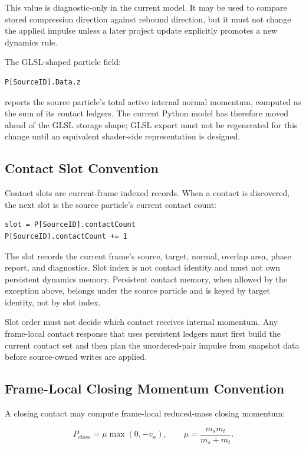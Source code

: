 This value is diagnostic-only in the current model.  It may be used to compare
stored compression direction against rebound direction, but it must not change
the applied impulse unless a later project update explicitly promotes a new
dynamics rule.

The GLSL-shaped particle field:

\begin{verbatim}
P[SourceID].Data.z
\end{verbatim}

reports the source particle's total active internal normal momentum, computed
as the sum of its contact ledgers.  The current Python model has therefore
moved ahead of the GLSL storage shape; GLSL export must not be regenerated for
this change until an equivalent shader-side representation is designed.

\subsection{Contact Slot Convention}

Contact slots are current-frame indexed records.  When a contact is discovered,
the next slot is the source particle's current contact count:

\begin{verbatim}
slot = P[SourceID].contactCount
P[SourceID].contactCount += 1
\end{verbatim}

The slot records the current frame's source, target, normal, overlap area,
phase report, and diagnostics.  Slot index is not contact identity and must
not own persistent dynamics memory.  Persistent contact memory, when allowed
by the exception above, belongs under the source particle and is keyed by
target identity, not by slot index.

Slot order must not decide which contact receives internal momentum.  Any
frame-local contact response that uses persistent ledgers must first build the
current contact set and then plan the unordered-pair impulse from snapshot
data before source-owned writes are applied.

\subsection{Frame-Local Closing Momentum Convention}

A closing contact may compute frame-local reduced-mass closing momentum:

\begin{equation}
P_{close} =
\mu \max(0,-v_n),
\qquad
\mu = \frac{m_s m_t}{m_s + m_t}.
\end{equation}


